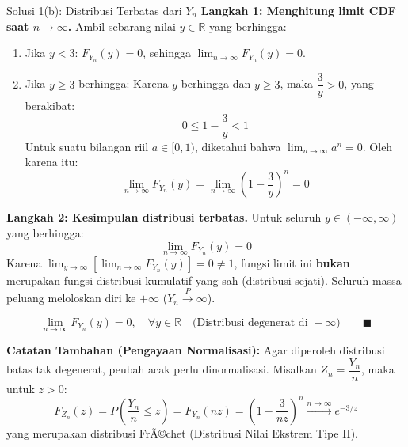 \documentclass[10pt,twoside]{article}
\begin{document}
\begin{solbox}{Solusi 1(b): Distribusi Terbatas dari $Y_n$}
\textbf{Langkah 1: Menghitung limit CDF saat $n \to \infty$.}
Ambil sebarang nilai $y \in \mathbb{R}$ yang berhingga:
\begin{enumerate}[label=\arabic*.]
  \item Jika $y < 3$: $F_{Y_n}(y) = 0$, sehingga $\lim_{n \to \infty} F_{Y_n}(y) = 0$.
  \item Jika $y \ge 3$ berhingga: Karena $y$ berhingga dan $y \ge 3$, maka $\dfrac{3}{y} > 0$, yang berakibat:
  \[
  0 \le 1 - \frac{3}{y} < 1
  \]
  Untuk suatu bilangan riil $a \in [0, 1)$, diketahui bahwa $\lim_{n \to \infty} a^n = 0$. Oleh karena itu:
  \[
  \lim_{n \to \infty} F_{Y_n}(y) = \lim_{n \to \infty} \left(1 - \frac{3}{y}\right)^n = 0
  \]
\end{enumerate}

\textbf{Langkah 2: Kesimpulan distribusi terbatas.}
Untuk seluruh $y \in (-\infty, \infty)$ yang berhingga:
\[
\lim_{n \to \infty} F_{Y_n}(y) = 0
\]
Karena $\lim_{y \to \infty} \left[\lim_{n \to \infty} F_{Y_n}(y)\right] = 0 \ne 1$, fungsi limit ini \textbf{bukan} merupakan fungsi distribusi kumulatif yang sah (distribusi sejati). Seluruh massa peluang meloloskan diri ke $+\infty$ ($Y_n \xrightarrow{P} \infty$).

\[
\boxed{\lim_{n \to \infty} F_{Y_n}(y) = 0, \quad \forall y \in \mathbb{R} \quad \text{(Distribusi degenerat di }+\infty\text{)}} \qquad \blacksquare
\]

\textbf{Catatan Tambahan (Pengayaan Normalisasi):}
Agar diperoleh distribusi batas tak degenerat, peubah acak perlu dinormalisasi. Misalkan $Z_n = \dfrac{Y_n}{n}$, maka untuk $z > 0$:
\[
F_{Z_n}(z) = P\left(\frac{Y_n}{n} \le z\right) = F_{Y_n}(nz) = \left(1 - \frac{3}{nz}\right)^n \xrightarrow{n \to \infty} e^{-3/z}
\]
yang merupakan distribusi FrÃ©chet (Distribusi Nilai Ekstrem Tipe II).
\end{solbox}
\end{document}
